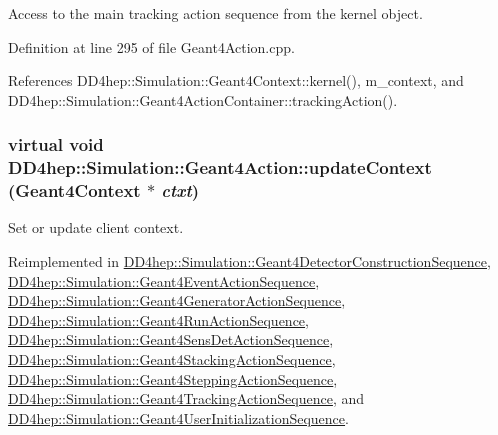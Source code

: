 Access to the main tracking action sequence from the kernel object. 

Definition at line 295 of file Geant4Action.cpp.

References DD4hep::Simulation::Geant4Context::kernel(), m\_\-context, and DD4hep::Simulation::Geant4ActionContainer::trackingAction().\hypertarget{class_d_d4hep_1_1_simulation_1_1_geant4_action_ae3b9daf2af881df956c46568c0743313}{
\subsubsection[{updateContext}]{\setlength{\rightskip}{0pt plus 5cm}virtual void DD4hep::Simulation::Geant4Action::updateContext ({\bf Geant4Context} $\ast$ {\em ctxt})}}
\label{class_d_d4hep_1_1_simulation_1_1_geant4_action_ae3b9daf2af881df956c46568c0743313}


Set or update client context. 

Reimplemented in \hyperlink{class_d_d4hep_1_1_simulation_1_1_geant4_detector_construction_sequence_a2ccfc854d0b38a4b1547422c2779e346}{DD4hep::Simulation::Geant4DetectorConstructionSequence}, \hyperlink{class_d_d4hep_1_1_simulation_1_1_geant4_event_action_sequence_a26291513e94aec2a01464d0121532999}{DD4hep::Simulation::Geant4EventActionSequence}, \hyperlink{class_d_d4hep_1_1_simulation_1_1_geant4_generator_action_sequence_a52b0d18dd3c29e1b1e133d9e1c73284b}{DD4hep::Simulation::Geant4GeneratorActionSequence}, \hyperlink{class_d_d4hep_1_1_simulation_1_1_geant4_run_action_sequence_ad94eee6a819a88302a0eaa0874d88fa3}{DD4hep::Simulation::Geant4RunActionSequence}, \hyperlink{class_d_d4hep_1_1_simulation_1_1_geant4_sens_det_action_sequence_a5878271f8da03d02bf4b3b8145246775}{DD4hep::Simulation::Geant4SensDetActionSequence}, \hyperlink{class_d_d4hep_1_1_simulation_1_1_geant4_stacking_action_sequence_a093447274a6d135bc1d69fe96ed0961c}{DD4hep::Simulation::Geant4StackingActionSequence}, \hyperlink{class_d_d4hep_1_1_simulation_1_1_geant4_stepping_action_sequence_aababd8e6f650101a6ade162f82a29f61}{DD4hep::Simulation::Geant4SteppingActionSequence}, \hyperlink{class_d_d4hep_1_1_simulation_1_1_geant4_tracking_action_sequence_a7afac2362f030a76e39cbdc7ab5b0ee7}{DD4hep::Simulation::Geant4TrackingActionSequence}, and \hyperlink{class_d_d4hep_1_1_simulation_1_1_geant4_user_initialization_sequence_ae73630ce8b3759e3793dc58f585a291b}{DD4hep::Simulation::Geant4UserInitializationSequence}.

